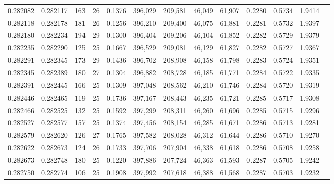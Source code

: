 \begin{tabular}{rrrrrrrrrrrrr}
0.282082 & 0.282117 &   163 &  26 &                                     0.1376 & 396,029 & 209,581 &  46,049 &  61,907 & 0.2280 & 0.5734 & 1.9414 \\
0.282118 & 0.282178 &   181 &  26 &                                     0.1256 & 396,210 & 209,400 &  46,075 &  61,881 & 0.2281 & 0.5732 & 1.9397 \\
0.282180 & 0.282234 &   194 &  29 &                                     0.1300 & 396,404 & 209,206 &  46,104 &  61,852 & 0.2282 & 0.5729 & 1.9379 \\
0.282235 & 0.282290 &   125 &  25 &                                     0.1667 & 396,529 & 209,081 &  46,129 &  61,827 & 0.2282 & 0.5727 & 1.9367 \\
0.282291 & 0.282345 &   173 &  29 &                                     0.1436 & 396,702 & 208,908 &  46,158 &  61,798 & 0.2283 & 0.5724 & 1.9351 \\
0.282345 & 0.282389 &   180 &  27 &                                     0.1304 & 396,882 & 208,728 &  46,185 &  61,771 & 0.2284 & 0.5722 & 1.9335 \\
0.282391 & 0.282445 &   166 &  25 &                                     0.1309 & 397,048 & 208,562 &  46,210 &  61,746 & 0.2284 & 0.5720 & 1.9319 \\
0.282446 & 0.282465 &   119 &  25 &                                     0.1736 & 397,167 & 208,443 &  46,235 &  61,721 & 0.2285 & 0.5717 & 1.9308 \\
0.282466 & 0.282525 &   132 &  25 &                                     0.1592 & 397,299 & 208,311 &  46,260 &  61,696 & 0.2285 & 0.5715 & 1.9296 \\
0.282527 & 0.282577 &   157 &  25 &                                     0.1374 & 397,456 & 208,154 &  46,285 &  61,671 & 0.2286 & 0.5713 & 1.9281 \\
0.282579 & 0.282620 &   126 &  27 &                                     0.1765 & 397,582 & 208,028 &  46,312 &  61,644 & 0.2286 & 0.5710 & 1.9270 \\
0.282622 & 0.282673 &   124 &  26 &                                     0.1733 & 397,706 & 207,904 &  46,338 &  61,618 & 0.2286 & 0.5708 & 1.9258 \\
0.282673 & 0.282748 &   180 &  25 &                                     0.1220 & 397,886 & 207,724 &  46,363 &  61,593 & 0.2287 & 0.5705 & 1.9242 \\
0.282750 & 0.282774 &   106 &  25 &                                     0.1908 & 397,992 & 207,618 &  46,388 &  61,568 & 0.2287 & 0.5703 & 1.9232 \\

\end{tabular}
